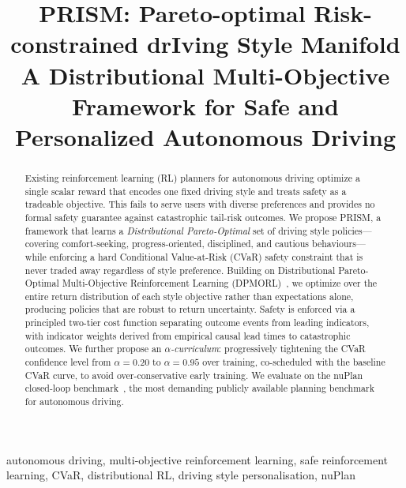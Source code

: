\documentclass[conference]{IEEEtran}
\begin{document}
\title{PRISM: Pareto-optimal Risk-constrained drIving Style Manifold\\
{\footnotesize A Distributional Multi-Objective Framework for Safe and
Personalized Autonomous Driving}}

\author{
}

\maketitle

\begin{abstract}
Existing reinforcement learning (RL) planners for autonomous driving
optimize a single scalar reward that encodes one fixed driving style and
treats safety as a tradeable objective. This fails to serve users with
diverse preferences and provides no formal safety guarantee against
catastrophic tail-risk outcomes. We propose PRISM, a framework that
learns a \emph{Distributional Pareto-Optimal} set of driving style
policies---covering comfort-seeking, progress-oriented, disciplined, and
cautious behaviours---while enforcing a hard Conditional Value-at-Risk
(CVaR) safety constraint that is never traded away regardless of style
preference. Building on Distributional Pareto-Optimal Multi-Objective
Reinforcement Learning (DPMORL)~\cite{DPMORL2023}, we optimize over the
entire return distribution of each style objective rather than
expectations alone, producing policies that are robust to return
uncertainty. Safety is enforced via a principled two-tier cost function
separating outcome events from leading indicators, with indicator weights
derived from empirical causal lead times to catastrophic outcomes. We
further propose an \emph{$\alpha$-curriculum}: progressively tightening
the CVaR confidence level from $\alpha\!=\!0.20$ to $\alpha\!=\!0.95$
over training, co-scheduled with the baseline CVaR curve, to avoid
over-conservative early training. We evaluate on the nuPlan closed-loop
benchmark~\cite{nuPlan2024}, the most demanding publicly available
planning benchmark for autonomous driving.
\end{abstract}

\begin{IEEEkeywords}
autonomous driving, multi-objective reinforcement learning,
safe reinforcement learning, CVaR, distributional RL,
driving style personalisation, nuPlan
\end{IEEEkeywords}
\end{document}
